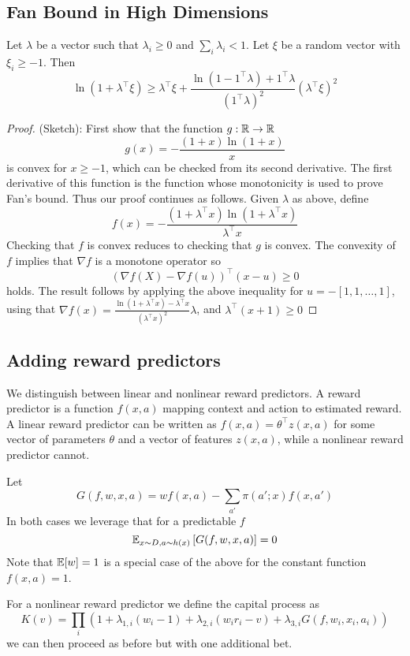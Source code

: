 \subsection{Fan Bound in High Dimensions}
Let $\lambda$ be a vector such that $\lambda_i \geq 0$ and
$\sum_i \lambda_i < 1$. Let $\xi$ be a random vector with
$\xi_i \geq -1$. Then
\[
\ln(1+\lambda^\top \xi) \geq \lambda^\top \xi + \frac{\ln(1-1^\top \lambda) +1^\top \lambda}{(1^\top \lambda)^2} (\lambda^\top \xi)^2
\]
\begin{proof}
(Sketch): First show that the function $g:\mathbb{R}\to\mathbb{R}$
\[
g(x) = -\frac{(1+x)\ln(1+x)}{x}
\]
is convex for $x\geq -1$, which can be checked from its second derivative.
The first derivative of this function is the function
whose monotonicity is used to prove Fan's bound. Thus
our proof continues as follows. Given $\lambda$ as above,
define  
\[
f(x) = -\frac{(1+\lambda^\top x)\ln(1+\lambda^\top x)}{\lambda^\top x}
\]
Checking that $f$ is convex reduces to checking that $g$ is convex.
The convexity of $f$ implies that $\nabla f$ is a monotone operator so
\[
(\nabla f(X) - \nabla f(u))^\top (x-u) \geq 0
\]
holds. The result follows by applying the above inequality for 
$u=-[1,1,\ldots,1]$, using that $\nabla f(x)=\frac{\ln(1+\lambda^\top x)-\lambda^\top x}{(\lambda^\top x)^2}\lambda$, and $\lambda^\top (x+1)\geq 0$
\end{proof}

\subsection{Adding reward predictors}
We distinguish between linear and nonlinear reward predictors.
A reward predictor is a function $f(x,a)$ mapping
context and action to estimated reward. A linear 
reward predictor can be written
as $f(x,a)=\theta^\top z(x,a)$ for some vector of parameters
$\theta$ and a vector of features $z(x,a)$, while a 
nonlinear reward predictor cannot. 

Let
\[
G(f,w,x,a)= w f(x,a) - \sum_{a'} \pi(a';x) f(x,a')
\]
In both cases we leverage that for a predictable $f$
\[
\mathbb{E}_{x\sim D,a\sim h(x)}\left[G(f,w,x,a)\right] = 0
\]
Note that $\mathbb{E}[w]=1$ is a special case of the above 
for the constant function $f(x,a)=1$. 

For a nonlinear reward predictor we define the capital 
process as
\[
K(v)=\prod_{i} \left(1+\lambda_{1,i} (w_i -1) 
+ \lambda_{2,i} (w_i r_i -v) 
+ \lambda_{3,i} G(f,w_i,x_i,a_i)\right)
\]
we can then proceed as before but with one additional
bet.

